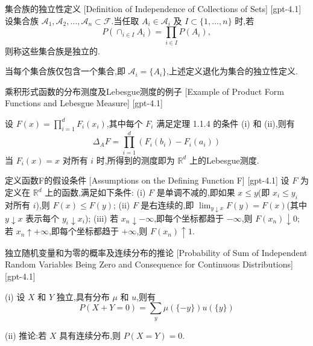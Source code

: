 \documentclass[UTF8]{ctexart}
\begin{document}
    
    
    \begin{dfn}
        {集合族的独立性定义}
        [Definition of Independence of Collections of Sets]
        [gpt-4.1]
        设集合族 $\mathcal{A}_1, \mathcal{A}_2, \ldots, \mathcal{A}_n \subset \mathcal{F}$.当任取 $A_i \in \mathcal{A}_i$ 及 $I \subset \{ 1, \ldots, n \}$ 时,若
\[
P\left(\cap_{i \in I} A_i \right) = \prod_{i \in I} P(A_i),
\]
则称这些集合族是独立的.

当每个集合族仅包含一个集合,即 $\mathcal{A}_i = \{A_i\}$,上述定义退化为集合的独立性定义.

    \end{dfn}
    
    
    
    \begin{xmp}
        {乘积形式函数的分布测度及Lebesgue测度的例子}
        [Example of Product Form Functions and Lebesgue Measure]
        [gpt-4.1]
        
设 $F(x) = \prod_{i=1}^{d} F_i(x_i)$,其中每个 $F_i$ 满足定理 1.1.4 的条件 (i) 和 (ii),则有
\[
\Delta_{A} F = \prod_{i=1}^{d} \left( F_i(b_i) - F_i(a_i) \right)
\]
当 $F_i(x) = x$ 对所有 $i$ 时,所得到的测度即为 $\mathbb{R}^d$ 上的Lebesgue测度.

    \end{xmp}
    
    
    
    \begin{dfn}
        {定义函数F的假设条件}
        [Assumptions on the Defining Function F]
        [gpt-4.1]
        设 $F$ 为定义在 $\mathbb{R}^d$ 上的函数,满足如下条件:
(i) $F$ 是单调不减的,即如果 $x \leq y$(即 $x_i \leq y_i$ 对所有 $i$),则 $F(x) \leq F(y)$;
(ii) $F$ 是右连续的,即 $\operatorname* { \lim }_{y \downarrow x} F(y) = F(x)$(其中 $y \downarrow x$ 表示每个 $y_i \downarrow x_i$);
(iii) 若 $x_n \downarrow -\infty$,即每个坐标都趋于 $-\infty$,则 $F(x_n) \downarrow 0$;
若 $x_n \uparrow +\infty$,即每个坐标都趋于 $+\infty$,则 $F(x_n) \uparrow 1$.

    \end{dfn}
    
    
    
    \begin{thm}
        {独立随机变量和为零的概率及连续分布的推论}
        [Probability of Sum of Independent Random Variables Being Zero and Consequence for Continuous Distributions]
        [gpt-4.1]
        
(i) 设 $X$ 和 $Y$ 独立,具有分布 $\mu$ 和 $
u$,则有
\[
P(X + Y = 0) = \sum_{y} \mu(\{-y\}) 
u(\{y\})
\]

(ii) 推论:若 $X$ 具有连续分布,则 $P(X = Y) = 0$.

    \end{thm}
    
\end{document}
